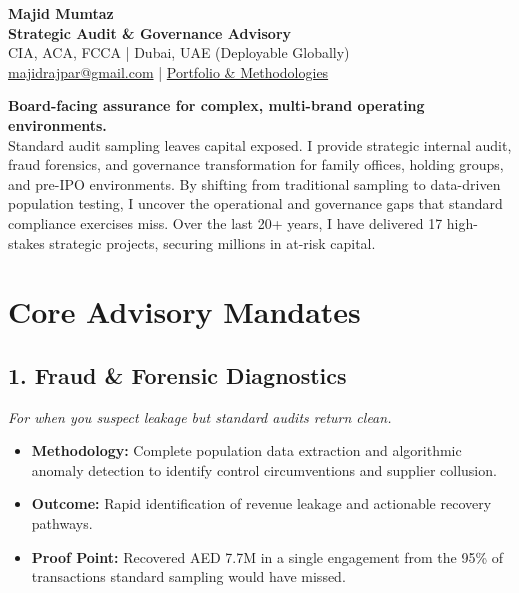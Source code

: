 \documentclass[11pt,a4paper]{article}
\begin{document}
\begin{flushleft}
{\Huge \textbf{\color{mbbDarkBlue} Majid Mumtaz}} \\ \vspace{0.3cm}
{\Large \textbf{Strategic Audit \& Governance Advisory}} \\ \vspace{0.1cm}
{\normalsize \color{mbbGray} CIA, ACA, FCCA | Dubai, UAE (Deployable Globally)} \\ \vspace{0.1cm}
{\normalsize \color{mbbDarkBlue} \href{mailto:majidrajpar@gmail.com}{majidrajpar@gmail.com} | \href{https://majidrajpar.github.io/portfolio_my}{Portfolio \& Methodologies}}
\end{flushleft}
\vspace{0.2cm}

\begin{tcolorbox}[colback=lightGray, colframe=mbbDarkBlue, arc=0pt, boxrule=1pt, left=10pt, right=10pt, top=10pt, bottom=10pt]
\textbf{\large Board-facing assurance for complex, multi-brand operating environments.} \\ \vspace{0.2cm}
Standard audit sampling leaves capital exposed. I provide strategic internal audit, fraud forensics, and governance transformation for family offices, holding groups, and pre-IPO environments. By shifting from traditional sampling to data-driven population testing, I uncover the operational and governance gaps that standard compliance exercises miss. Over the last 20+ years, I have delivered 17 high-stakes strategic projects, securing millions in at-risk capital.
\end{tcolorbox}

\section*{Core Advisory Mandates}
\subsection*{1. Fraud \& Forensic Diagnostics}
\textit{For when you suspect leakage but standard audits return clean.}
\begin{itemize}
    \item \textbf{Methodology:} Complete population data extraction and algorithmic anomaly detection to identify control circumventions and supplier collusion.
    \item \textbf{Outcome:} Rapid identification of revenue leakage and actionable recovery pathways.
    \item \textbf{Proof Point:} Recovered AED 7.7M in a single engagement from the 95\% of transactions standard sampling would have missed.
\end{itemize}
\end{document}
